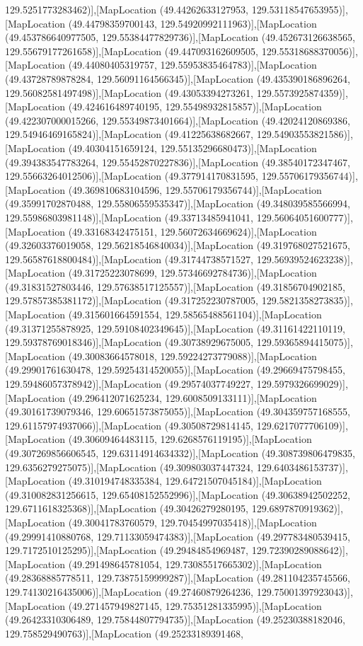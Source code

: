 129.5251773283462)],[MapLocation (49.44262633127953, 129.53118547653955)],[MapLocation (49.44798359700143, 129.54920992111963)],[MapLocation (49.453786640977505, 129.55384477829736)],[MapLocation (49.452673126638565, 129.55679177261658)],[MapLocation (49.447093162609505, 129.55318688370056)],[MapLocation (49.44080405319757, 129.55953835464783)],[MapLocation (49.43728789878284, 129.56091164566345)],[MapLocation (49.435390186896264, 129.56082581497498)],[MapLocation (49.43053394273261, 129.5573925874359)],[MapLocation (49.424616489740195, 129.55498932815857)],[MapLocation (49.422307000015266, 129.55349873401664)],[MapLocation (49.42024120869386, 129.54946469165824)],[MapLocation (49.41225638682667, 129.54903553821586)],[MapLocation (49.40304151659124, 129.55135296680473)],[MapLocation (49.394383547783264, 129.55452870227836)],[MapLocation (49.38540172347467, 129.55663264012506)],[MapLocation (49.377914170831595, 129.55706179356744)],[MapLocation (49.369810683104596, 129.55706179356744)],[MapLocation (49.35991702870488, 129.55806559535347)],[MapLocation (49.348039585566994, 129.55986803981148)],[MapLocation (49.33713485941041, 129.56064051600777)],[MapLocation (49.33168342475151, 129.56072634669624)],[MapLocation (49.32603376019058, 129.56218546840034)],[MapLocation (49.319768027521675, 129.56587618800484)],[MapLocation (49.31744738571527, 129.56939524623238)],[MapLocation (49.31725223078699, 129.57346692784736)],[MapLocation (49.31831527803446, 129.57638517125557)],[MapLocation (49.31856704902185, 129.57857385381172)],[MapLocation (49.317252230787005, 129.5821358273835)],[MapLocation (49.315601664591554, 129.58565488561104)],[MapLocation (49.31371255878925, 129.59108402349645)],[MapLocation (49.31161422110119, 129.59378769018346)],[MapLocation (49.30738929675005, 129.59365894415075)],[MapLocation (49.30083664578018, 129.59224273779088)],[MapLocation (49.29901761630478, 129.59254314520055)],[MapLocation (49.29669475798455, 129.59486057378942)],[MapLocation (49.29574037749227, 129.5979326699029)],[MapLocation (49.296412071625234, 129.6008509133111)],[MapLocation (49.30161739079346, 129.60651573875055)],[MapLocation (49.304359757168555, 129.61157974937066)],[MapLocation (49.30508729814145, 129.6217077706109)],[MapLocation (49.30609464483115, 129.6268576119195)],[MapLocation (49.307269856606545, 129.63114914634332)],[MapLocation (49.308739806479835, 129.6356279275075)],[MapLocation (49.309803037447324, 129.6403486153737)],[MapLocation (49.310194748335384, 129.64721507045184)],[MapLocation (49.310082831256615, 129.65408152552996)],[MapLocation (49.30638942502252, 129.6711618325368)],[MapLocation (49.30426279280195, 129.6897870919362)],[MapLocation (49.30041783760579, 129.70454997035418)],[MapLocation (49.29991410880768, 129.71133059474383)],[MapLocation (49.297783480539415, 129.7172510125295)],[MapLocation (49.29484854969487, 129.72390289088642)],[MapLocation (49.291498645781054, 129.73085517665302)],[MapLocation (49.28368885778511, 129.73875159999287)],[MapLocation (49.281104235745566, 129.74130216435006)],[MapLocation (49.27460879264236, 129.75001397923043)],[MapLocation (49.271457949827145, 129.75351281335995)],[MapLocation (49.26423310306489, 129.75844807794735)],[MapLocation (49.25230388182046, 129.758529490763)],[MapLocation (49.25233189391468, 